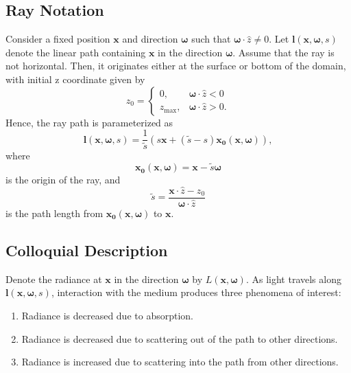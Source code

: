 \documentclass[ms,cpyr,lof,lot]{uathesis}
\newcommand\zmax{{z_{\max}}}
\renewcommand\vec\bm
\begin{document}
\subsection{Ray Notation}
Consider a fixed position $\vec{x}$ and direction $\vec{\omega}$ such that
$\vec{\omega} \cdot \hat{z} \neq 0$.
Let $\vec{l}(\vec{x}, \vec{\omega}, s)$ denote the linear path containing $\vec{x}$ in the direction $\vec{\omega}$.
Assume that the ray is not horizontal.
Then, it originates either at the surface or bottom of the domain, with initial z coordinate given by
\begin{equation*}
  z_0 =
   \begin{cases}
    0, & \vec{\omega} \cdot \hat{z} < 0 \\
    \zmax, & \vec{\omega} \cdot \hat{z} > 0.
  \end{cases}
\end{equation*}
Hence, the ray path is parameterized as
\begin{equation}
  \vec{l}(\vec{x}, \vec{\omega}, s) = \frac{1}{\tilde{s}} (s\vec{x} + (\tilde{s} - s)\vec{x_0}(\vec{x}, \vec{\omega})),
  \label{eqn:ray_path}
\end{equation}
where
\begin{equation*}
  \vec{x_0}(\vec{x}, \vec{\omega}) = \vec{x} - \tilde{s} \vec{\omega}
\end{equation*}
is the origin of the ray, and 
\begin{equation*}
  \tilde{s} = \frac{\vec{x} \cdot \hat{z} - z_0}{\vec{\omega} \cdot \hat{z}}
\end{equation*}
is the path length from $\vec{x_0}(\vec{x}, \vec{\omega})$ to $\vec{x}$.

\subsection{Colloquial Description}
Denote the radiance at $\vec{x}$ in the direction $\vec{\omega}$ by $L(\vec{x}, \vec{\omega})$.
As light travels along $\vec{l}(\vec{x}, \vec{\omega}, s)$, interaction with the
medium produces three phenomena of interest:
\begin{enumerate}
  \item Radiance is decreased due to absorption.
  \item Radiance is decreased due to scattering out of the path to other
    directions.
  \item Radiance is increased due to scattering into the path from other
      directions.
\end{enumerate}
\end{document}
